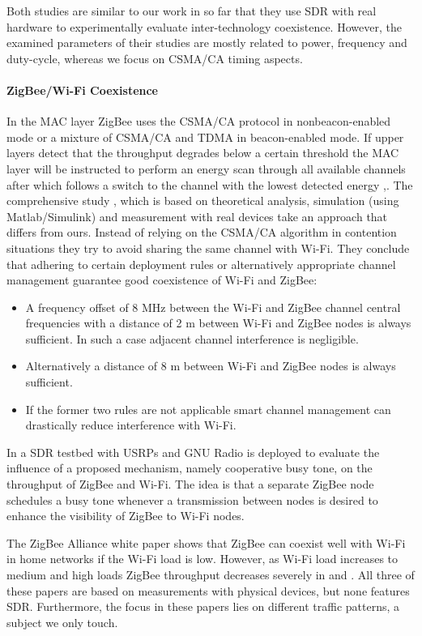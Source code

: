 Both studies are similar to our work in so far that they use SDR with real hardware to experimentally evaluate inter-technology coexistence. However, the examined parameters of their studies are mostly related to power, frequency and duty-cycle, whereas we focus on CSMA/CA timing aspects.

\paragraph{ZigBee/Wi-Fi Coexistence}

In the MAC layer ZigBee uses the CSMA/CA protocol in nonbeacon-enabled mode or a mixture of CSMA/CA and TDMA in beacon-enabled mode. If upper layers detect that the throughput degrades below a certain threshold the MAC layer will be instructed to perform an energy scan through all available channels after which follows a switch to the channel with the lowest detected energy \cite{yi11},\cite{zhang11}. 
The comprehensive study \cite{yi11}, which is based on theoretical analysis, simulation (using Matlab/Simulink) and measurement with real devices take an approach that differs from ours. Instead of relying on the CSMA/CA algorithm in contention situations they try to avoid sharing the same channel with Wi-Fi. They conclude that adhering to certain deployment rules or alternatively appropriate channel management guarantee good coexistence of Wi-Fi and ZigBee:
\begin{itemize}
	\item A frequency offset of 8 MHz between the Wi-Fi and ZigBee channel central frequencies with a distance of 2 m between Wi-Fi and ZigBee nodes is always sufficient. In such a case adjacent channel interference is negligible.
	\item Alternatively a distance of 8 m between Wi-Fi and ZigBee nodes is always sufficient.
	\item If the former two rules are not applicable smart channel management can drastically reduce interference with Wi-Fi.
\end{itemize}

In \cite{zhang11} a SDR testbed with USRPs and GNU Radio is deployed to evaluate the influence of a proposed mechanism, namely cooperative busy tone, on the throughput of ZigBee and Wi-Fi. The idea is that a separate ZigBee node schedules a busy tone whenever a transmission between nodes is desired to enhance the visibility of ZigBee to Wi-Fi nodes. 

The ZigBee Alliance white paper \cite{thonet08} shows that ZigBee can coexist well with Wi-Fi in home networks if the Wi-Fi load is low. However, as Wi-Fi load increases to medium and high loads ZigBee throughput decreases severely in \cite{gummadi09} and \cite{polin08}. All three of these papers are based on measurements with physical devices, but none features SDR. Furthermore, the focus in these papers lies on different traffic patterns, a subject we only touch.

